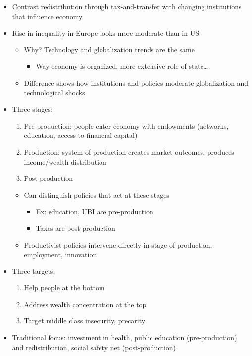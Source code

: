 \begin{itemize}
\tightlist
\item
  Contrast redistribution through tax-and-transfer with changing
  institutions that influence economy
\item
  Rise in inequality in Europe looks more moderate than in US

  \begin{itemize}
  \tightlist
  \item
    Why? Technology and globalization trends are the same

    \begin{itemize}
    \tightlist
    \item
      Way economy is organized, more extensive role of state\ldots{}
    \end{itemize}
  \item
    Difference shows how institutions and policies moderate
    globalization and technological shocks
  \end{itemize}
\item
  Three stages:

  \begin{enumerate}
  \def\labelenumi{\arabic{enumi}.}
  \tightlist
  \item
    Pre-production: people enter economy with endowments (networks,
    education, access to financial capital)
  \item
    Production: system of production creates market outcomes, produces
    income/wealth distribution
  \item
    Post-production
  \end{enumerate}

  \begin{itemize}
  \tightlist
  \item
    Can distinguish policies that act at these stages

    \begin{itemize}
    \tightlist
    \item
      Ex: education, UBI are pre-production
    \item
      Taxes are post-production
    \end{itemize}
  \item
    Productivist policies intervene directly in stage of production,
    employment, innovation
  \end{itemize}
\item
  Three targets:

  \begin{enumerate}
  \def\labelenumi{\arabic{enumi}.}
  \tightlist
  \item
    Help people at the bottom
  \item
    Address wealth concentration at the top
  \item
    Target middle class insecurity, precarity
  \end{enumerate}
\item
  Traditional focus: investment in health, public education
  (pre-production) and redistribution, social safety net
  (post-production)


\end{itemize}

